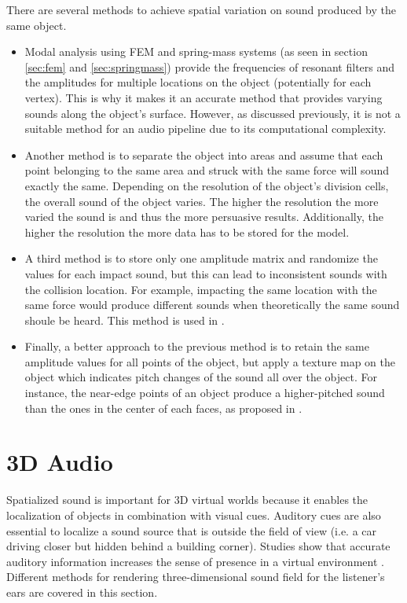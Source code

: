 There are several methods to achieve spatial variation on sound produced by the same object. 
\begin{itemize}
\item Modal analysis using \gls{FEM} and spring-mass systems (as seen in section \ref{sec:fem} and \ref{sec:springmass}) provide the frequencies of resonant filters and the amplitudes for multiple locations on the object (potentially for each vertex). This is why it makes it an accurate method that provides varying sounds along the object's surface. However, as discussed previously, it is not a suitable method for an audio pipeline due to its computational complexity.

\item Another method is to separate the object into areas and assume that each point belonging to the same area and struck with the same force will sound exactly the same. Depending on the resolution of the object's division cells, the overall sound of the object varies. The higher the resolution the more varied the sound is and thus the more persuasive results. Additionally, the higher the resolution the more data has to be stored for the model.

\item A third method is to store only one amplitude matrix and randomize the values for each impact sound, but this can lead to  inconsistent sounds with the collision location. For example, impacting the same location with the same force would produce different sounds when theoretically the same sound shoule be heard. This method is used in \cite{lloyd2011sound}.

\item Finally, a better approach to the previous method is to retain the same amplitude values for all points of the object, but apply a texture map on the object which indicates pitch changes of the sound all over the object. For instance, the near-edge points of an object produce a higher-pitched sound than the ones in the center of each faces, as proposed in \cite{lloyd2011sound}.

\end{itemize}

\section{3D Audio}

Spatialized sound is important for 3D virtual worlds because it enables the localization of objects in combination with visual cues. Auditory cues are also essential to localize a sound source that is outside the field of view (i.e. a car driving closer but hidden behind a building corner). Studies show that accurate auditory information increases the sense of presence in a virtual environment \cite{larsson2002better}. Different methods for rendering three-dimensional sound field for the listener's ears are covered in this section.

